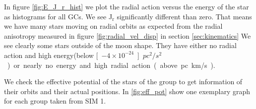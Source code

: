 In figure \ref{fig:E_J_r_hist} we plot the radial action versus the energy of the star as histograms for all \acp{GC}. We see J\(_\mathrm{r}\) significantly different than zero. That means we have many stars moving on radial orbits as expected from the radial anisotropy measured in figure \ref{fig:radial_vel_disp} in section \ref{sec:kinematics} We see clearly some stars outside of the moon shape. They have either no radial action and high energy(below \unit[\(-4 \times10^{-24}\)]{\(pc^2/s^2\)}) or nearly no energy and high radial action (above \unit[500]{pc km/s}). 

\par We check the effective potential of the stars of the group to get information of their orbits and their actual positions. In \ref{fig:eff_pot} show one exemplary graph for each group taken from SIM 1. 

